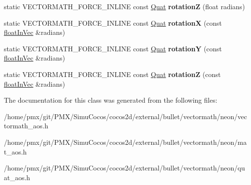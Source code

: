 \begin{DoxyCompactItemize}
\mbox{\label{classVectormath_1_1Aos_1_1Quat_ac8eb2952c4d6297593c617cfd1edf16d}} 
static V\+E\+C\+T\+O\+R\+M\+A\+T\+H\+\_\+\+F\+O\+R\+C\+E\+\_\+\+I\+N\+L\+I\+NE const \hyperlink{classVectormath_1_1Aos_1_1Quat}{Quat} {\bfseries rotationZ} (float radians)
\item 
\mbox{\label{classVectormath_1_1Aos_1_1Quat_a6a255cb9e389d5633d8714e8b1fb6e91}} 
static V\+E\+C\+T\+O\+R\+M\+A\+T\+H\+\_\+\+F\+O\+R\+C\+E\+\_\+\+I\+N\+L\+I\+NE const \hyperlink{classVectormath_1_1Aos_1_1Quat}{Quat} {\bfseries rotationX} (const \hyperlink{classVectormath_1_1floatInVec}{float\+In\+Vec} \&radians)
\item 
\mbox{\label{classVectormath_1_1Aos_1_1Quat_a5c1d829df81135694b44736f07092217}} 
static V\+E\+C\+T\+O\+R\+M\+A\+T\+H\+\_\+\+F\+O\+R\+C\+E\+\_\+\+I\+N\+L\+I\+NE const \hyperlink{classVectormath_1_1Aos_1_1Quat}{Quat} {\bfseries rotationY} (const \hyperlink{classVectormath_1_1floatInVec}{float\+In\+Vec} \&radians)
\item 
\mbox{\label{classVectormath_1_1Aos_1_1Quat_a9132b880923cba309dc39f3857a4c87e}} 
static V\+E\+C\+T\+O\+R\+M\+A\+T\+H\+\_\+\+F\+O\+R\+C\+E\+\_\+\+I\+N\+L\+I\+NE const \hyperlink{classVectormath_1_1Aos_1_1Quat}{Quat} {\bfseries rotationZ} (const \hyperlink{classVectormath_1_1floatInVec}{float\+In\+Vec} \&radians)
\end{DoxyCompactItemize}


The documentation for this class was generated from the following files\+:\begin{DoxyCompactItemize}
\item 
/home/pmx/git/\+P\+M\+X/\+Simu\+Cocos/cocos2d/external/bullet/vectormath/neon/vectormath\+\_\+aos.\+h\item 
/home/pmx/git/\+P\+M\+X/\+Simu\+Cocos/cocos2d/external/bullet/vectormath/neon/mat\+\_\+aos.\+h\item 
/home/pmx/git/\+P\+M\+X/\+Simu\+Cocos/cocos2d/external/bullet/vectormath/neon/quat\+\_\+aos.\+h\end{DoxyCompactItemize}
